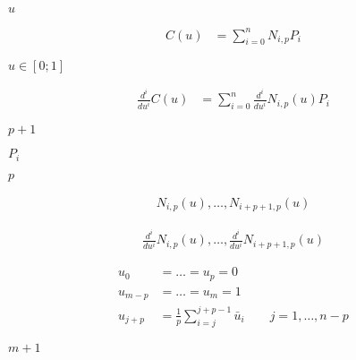 \documentclass{article}
\begin{document}
$u$
\pagebreak

\begin{align*}
  C(u) & = \sum_{i=0}^{n}N_{i,p}P_i
\end{align*}
\pagebreak

$u \in [0;1]$
\pagebreak

\begin{align*}
  \frac{d^i}{du^i}C(u) & = \sum_{i=0}^{n} \frac{d^i}{du^i} N_{i,p}(u)P_i
\end{align*}
\pagebreak

$p+1$
\pagebreak

$P_i$
\pagebreak

$p$
\pagebreak

\begin{align*}
  N_{i,p}(u), \hdots, N_{i+p+1,p}(u)
\end{align*}
\pagebreak

\begin{align*}
  \frac{d^i}{du^i} N_{i,p}(u), \hdots, \frac{d^i}{du^i} N_{i+p+1,p}(u)
\end{align*}
\pagebreak

\begin{align*}
 u_0 & = \hdots = u_p = 0 \\
 u_{m-p} & = \hdots = u_{m} = 1 \\
 u_{j+p} & = \frac{1}{p}\sum_{i=j}^{j+p-1}\bar{u}_i \quad\quad j=1,\hdots,n-p
\end{align*}
\pagebreak

$m+1$
\pagebreak
\end{document}
